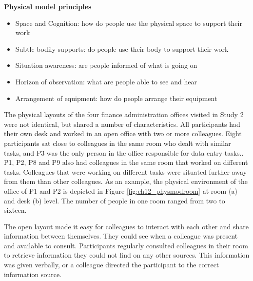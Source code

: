 \begin{framed}\noindent
\textbf{Physical model principles}

\begin{itemize}
\item Space and Cognition: how do people use the physical space to support their work
\item Subtle bodily supports: do people use their body to support their work
\item Situation awareness: are people informed of what is going on
\item Horizon of observation: what are people able to see and hear
\item Arrangement of equipment: how do people arrange their equipment
\end{itemize}

\end{framed}

The physical layouts of the four finance administration offices visited in Study 2 were not identical, but shared a number of characteristics. All participants had their own desk and worked in an open office with two or more colleagues. Eight participants sat close to colleagues in the same room who dealt with similar tasks, and P3 was the only person in the office responsible for data entry tasks.. P1, P2, P8 and P9 also had colleagues in the same room that worked on different tasks. Colleagues that were working on different tasks were situated further away from them than other colleagues. As an example, the physical environment of the office of P1 and P2 is depicted in Figure \ref{fig:ch12_physmodroom} at room (a) and desk (b) level. The number of people in one room ranged from two to sixteen. 

The open layout made it easy for colleagues to interact with each other and share information between themselves. They could see when a colleague was present and available to consult. Participants regularly consulted colleagues in their room to retrieve information they could not find on any other sources. This information was given verbally, or a colleague directed the participant to the correct information source.

